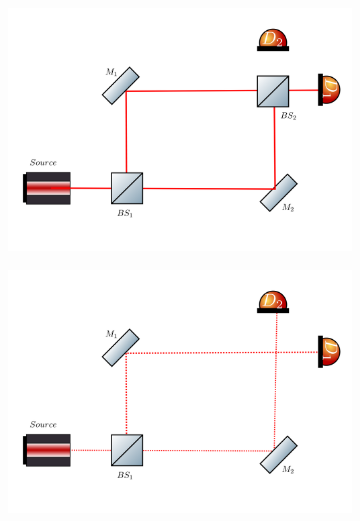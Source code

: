 \documentclass[12pt]{book}
\begin{document}
\begin{figure}[t!]
\begin{subfigure}{0.45\linewidth}
  \centering
\includegraphics[width=\linewidth]{images/wheeler1.png}
\caption{}
\label{wheeler1}
\end{subfigure}
\begin{subfigure}{0.45\linewidth}
  \centering
\includegraphics[width=\linewidth]{images/wheeler2.png}
\caption{}
\label{wheeler2}
\end{subfigure}
\begin{subfigure}{0.45\linewidth}
  \centering

\end{subfigure}
\end{figure}
\end{document}
